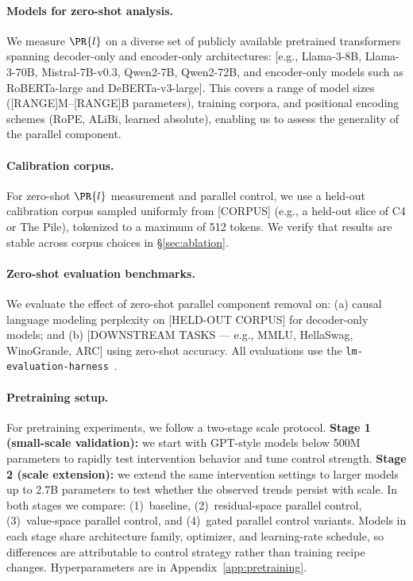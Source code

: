 \paragraph{Models for zero-shot analysis.}
We measure $\PR{l}$ on a diverse set of publicly available pretrained transformers spanning
decoder-only and encoder-only architectures: [e.g., Llama-3-8B,
Llama-3-70B, Mistral-7B-v0.3, Qwen2-7B, Qwen2-72B, and encoder-only models
such as RoBERTa-large and DeBERTa-v3-large].
This covers a range of model sizes ([RANGE]M--[RANGE]B parameters),
training corpora, and positional encoding schemes (RoPE, ALiBi, learned
absolute), enabling us to assess the generality of the parallel component.

\paragraph{Calibration corpus.}
For zero-shot $\PR{l}$ measurement and parallel control, we use
a held-out calibration corpus sampled uniformly from [CORPUS] (e.g., a held-out slice of
C4 or The Pile), tokenized to a maximum of 512 tokens.
We verify that results are stable across corpus choices in \S\ref{sec:ablation}.

\paragraph{Zero-shot evaluation benchmarks.}
We evaluate the effect of zero-shot parallel component removal on:
(a) causal language modeling perplexity on [HELD-OUT CORPUS] for decoder-only
models; and (b) [DOWNSTREAM TASKS — e.g., MMLU, HellaSwag, WinoGrande, ARC]
using zero-shot accuracy.
All evaluations use the \texttt{lm-evaluation-harness}~\citep{gao2021framework}.

\paragraph{Pretraining setup.}
For pretraining experiments, we follow a two-stage scale protocol.
\textbf{Stage 1 (small-scale validation):} we start with GPT-style models
below 500M parameters to rapidly test intervention behavior and tune control
strength.
\textbf{Stage 2 (scale extension):} we extend the same intervention settings
to larger models up to 2.7B parameters to test whether the observed trends
persist with scale.
In both stages we compare: (1)~baseline, (2)~residual-space parallel control,
(3)~value-space parallel control, and (4)~gated parallel control variants.
Models in each stage share architecture family, optimizer, and learning-rate
schedule, so differences are attributable to control strategy rather than
training recipe changes. Hyperparameters are in
Appendix~\ref{app:pretraining}.

